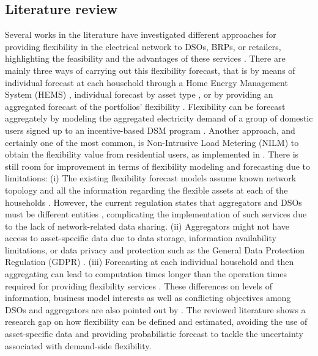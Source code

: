\subsection{Literature review}
Several works in the literature have investigated different approaches for providing flexibility in the electrical network to DSOs, BRPs, or retailers, highlighting the feasibility and the advantages of these services \cite{Huber2020, Bodal2017, Gorria2013, Pinto2017,Lucas2019, Yue2020}. There are mainly three ways of carrying out this flexibility forecast, that is by means of individual forecast at each household through a Home Energy Management System (HEMS) \cite{Pinto2017}, individual forecast by asset type \cite{Huber2020}, or by providing an aggregated forecast of the portfolios' flexibility \cite{Bodal2017}. Flexibility can be forecast aggregately by modeling the aggregated electricity demand of a group of domestic users signed up to an incentive-based DSM program \cite{Gorria2013}. Another approach, and certainly one of the most common, is Non-Intrusive Load Metering (NILM) to obtain the flexibility value from residential users, as implemented in  \cite{Lucas2019, Yue2020}. %
There is still room for improvement in terms of flexibility modeling and forecasting due to limitations: (i) The existing flexibility forecast models assume known network topology and all the information regarding the flexible assets at each of the households \cite{Pinto2017, Gorria2013}. However, the current regulation states that aggregators and DSOs must be different entities \cite{Guldbaek2017, BEUC2018, EuropeanParliament2019}, complicating the implementation of such services due to the lack of network-related data sharing. (ii) Aggregators might not have access to asset-specific data due to data storage, information availability limitations, or data privacy and protection such as the General Data Protection Regulation (GDPR) \cite{GDPR1, GDPR2}. (iii) Forecasting at each individual household and then aggregating can lead to computation times longer than the operation times required for providing flexibility services \cite{Olivella2020}. These differences on levels of information, business model interests as well as conflicting objectives among DSOs and aggregators are also pointed out by \cite{Heinrich2020}. The reviewed literature shows a research gap on how flexibility can be defined and estimated, avoiding the use of asset-specific data and providing probabilistic forecast to tackle the uncertainty associated with demand-side flexibility.

